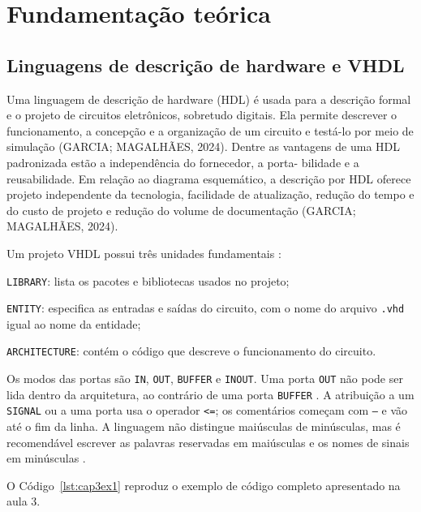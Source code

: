 \chapter{Fundamentação teórica}
\label{cap:fundamentos}

\section{Linguagens de descrição de hardware e VHDL}

Uma linguagem de descrição de hardware (HDL) é usada para a descrição formal e o projeto de
circuitos eletrônicos, sobretudo digitais. Ela permite descrever o funcionamento, a concepção
e a organização de um circuito e testá-lo por meio de simulação (GARCIA; MAGALHÃES, 2024).
Dentre as vantagens de uma HDL padronizada estão a independência do fornecedor, a porta-
bilidade e a reusabilidade. Em relação ao diagrama esquemático, a descrição por HDL oferece
projeto independente da tecnologia, facilidade de atualização, redução do tempo e do custo
de projeto e redução do volume de documentação (GARCIA; MAGALHÃES, 2024).


Um projeto VHDL possui três unidades fundamentais \cite{aula3}:

\begin{listar}
  \item \texttt{LIBRARY}: lista os pacotes e bibliotecas usados no projeto;
  \item \texttt{ENTITY}: especifica as entradas e saídas do circuito, com o
        nome do arquivo \texttt{.vhd} igual ao nome da entidade;
  \item \texttt{ARCHITECTURE}: contém o código que descreve o funcionamento do
        circuito.
\end{listar}

Os modos das portas são \texttt{IN}, \texttt{OUT}, \texttt{BUFFER} e
\texttt{INOUT}. Uma porta \texttt{OUT} não pode ser lida dentro da
arquitetura, ao contrário de uma porta \texttt{BUFFER} \cite{aula3}. A
atribuição a um \texttt{SIGNAL} ou a uma porta usa o operador \texttt{<=}; os
comentários começam com \texttt{--} e vão até o fim da linha. A linguagem não
distingue maiúsculas de minúsculas, mas é recomendável escrever as palavras
reservadas em maiúsculas e os nomes de sinais em minúsculas \cite{aula3}.

O Código~\ref{lst:cap3ex1} reproduz o exemplo de código completo apresentado
na aula 3.

